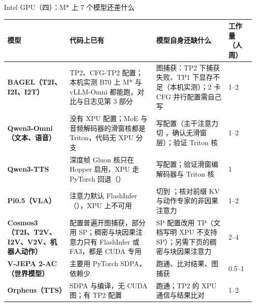 \begin{frame}[t]{Intel GPU（四）：M* 上 7 个模型还差什么}
\scriptsize\def\codesize{\relax}
\renewcommand{\arraystretch}{1.12}
\setlength{\tabcolsep}{3pt}
\begin{tabularx}{\textwidth}{>{\bfseries}p{2.6cm} Y Y p{2.2cm}}
\toprule
{}
模型 & 代码上已有 & 模型自身还缺什么 & 工作量（人周） \\
\midrule
BAGEL（T2I、I2I、I2T） & TP2、CFG-TP2 配置；本机实测 B70 上 M* 与 vLLM-Omni 都能跑，对比与日志见第 3 部分 & 图捕获：TP2 下捕获失败、TP1 下显存不足（本机实测）；2 卡 CFG 并行配置需自己写 & 1--2 \\
Qwen3-Omni（文本、语音） & 没有 XPU 配置；MoE 与音频解码器的滑窗核都是 Triton，代码无 XPU 分支 & 写配置（主干注意力切 ，确认无滑窗层）；验证 Triton 核 & 1--2 \\
Qwen3-TTS & 深度帧 Gluon 核只在 Hopper 启用，XPU 走 PyTorch 回退（） & 写配置；验证滑窗编解码器与 Triton 核 & 1 \\
Pi0.5（VLA） & 注意力默认 FlashInfer（），XPU 上不可用 & 切到 ；核对前缀 KV 与动作专家的非因果注意力 & 1--2 \\
Cosmos3（T2I、T2V、I2V、V2V、机器人动作） & 配置普遍开图捕获，部分用 SP；稠密与块因果注意力只有 FlashInfer 或 FA3，都是 CUDA 专用 & SP 配置改用 TP（文档写明 XPU 不支持 SP）；另需下页的稠密与块因果注意力 & 2--4 \\
V-JEPA 2-AC（世界模型） & 主要用 PyTorch SDPA，依赖少 & 跑通、比对结果、图捕获 & 0.5--1 \\
Orpheus（TTS） & SDPA 与编译，无 CUDA 图；有 TP2 配置 & 跑通；TP2 的 XPU 通信与结果比对 & 1--2 \\
\bottomrule
\end{tabularx}
\end{frame}

